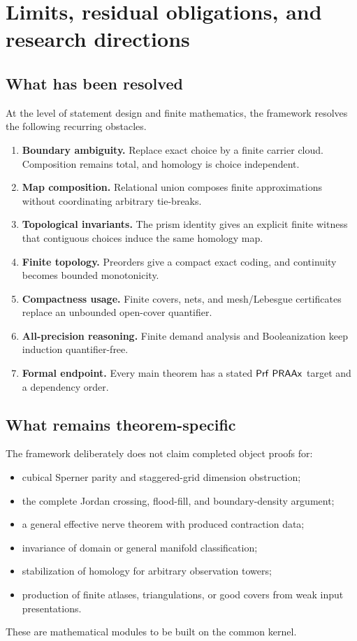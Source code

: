 
\section{Limits, residual obligations, and research directions}
\label{sec:limits}

\subsection{What has been resolved}

At the level of statement design and finite mathematics, the framework resolves the following recurring obstacles.

\begin{enumerate}
  \item \textbf{Boundary ambiguity.}  Replace exact choice by a finite carrier cloud.  Composition remains total, and homology is choice independent.
  \item \textbf{Map composition.}  Relational union composes finite approximations without coordinating arbitrary tie-breaks.
  \item \textbf{Topological invariants.}  The prism identity gives an explicit finite witness that contiguous choices induce the same homology map.
  \item \textbf{Finite topology.}  Preorders give a compact exact coding, and continuity becomes bounded monotonicity.
  \item \textbf{Compactness usage.}  Finite covers, nets, and mesh/Lebesgue certificates replace an unbounded open-cover quantifier.
  \item \textbf{All-precision reasoning.}  Finite demand analysis and Booleanization keep induction quantifier-free.
  \item \textbf{Formal endpoint.}  Every main theorem has a stated $\mathsf{Prf}\ \mathsf{PRAAx}$ target and a dependency order.
\end{enumerate}

\subsection{What remains theorem-specific}

The framework deliberately does not claim completed object proofs for:
\begin{itemize}
  \item cubical Sperner parity and staggered-grid dimension obstruction;
  \item the complete Jordan crossing, flood-fill, and boundary-density argument;
  \item a general effective nerve theorem with produced contraction data;
  \item invariance of domain or general manifold classification;
  \item stabilization of homology for arbitrary observation towers;
  \item production of finite atlases, triangulations, or good covers from weak input presentations.
\end{itemize}
These are mathematical modules to be built on the common kernel.

